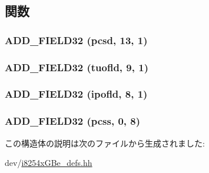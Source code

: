 \subsection{関数}
\hypertarget{structiGbReg_1_1Regs_1_1RXCSUM_ad10520b43b14570d664a2de95b5dc761}{
\subsubsection[{ADD\_\-FIELD32}]{\setlength{\rightskip}{0pt plus 5cm}ADD\_\-FIELD32 (pcsd, \/  13, \/  1)}}
\label{structiGbReg_1_1Regs_1_1RXCSUM_ad10520b43b14570d664a2de95b5dc761}
\hypertarget{structiGbReg_1_1Regs_1_1RXCSUM_a1d3cb3b422ae90b17bf4db1057db7723}{
\subsubsection[{ADD\_\-FIELD32}]{\setlength{\rightskip}{0pt plus 5cm}ADD\_\-FIELD32 (tuofld, \/  9, \/  1)}}
\label{structiGbReg_1_1Regs_1_1RXCSUM_a1d3cb3b422ae90b17bf4db1057db7723}
\hypertarget{structiGbReg_1_1Regs_1_1RXCSUM_ab1bf26ef899ed95d4ad59ecef141170c}{
\subsubsection[{ADD\_\-FIELD32}]{\setlength{\rightskip}{0pt plus 5cm}ADD\_\-FIELD32 (ipofld, \/  8, \/  1)}}
\label{structiGbReg_1_1Regs_1_1RXCSUM_ab1bf26ef899ed95d4ad59ecef141170c}
\hypertarget{structiGbReg_1_1Regs_1_1RXCSUM_ae92cbd75d7bd66217620641bbe7ff662}{
\subsubsection[{ADD\_\-FIELD32}]{\setlength{\rightskip}{0pt plus 5cm}ADD\_\-FIELD32 (pcss, \/  0, \/  8)}}
\label{structiGbReg_1_1Regs_1_1RXCSUM_ae92cbd75d7bd66217620641bbe7ff662}


この構造体の説明は次のファイルから生成されました:\begin{DoxyCompactItemize}
\item 
dev/\hyperlink{i8254xGBe__defs_8hh}{i8254xGBe\_\-defs.hh}\end{DoxyCompactItemize}
